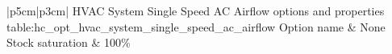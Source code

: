 \begin{customLongTable}{ |p{5cm}|p{3cm}| }
{HVAC System Single Speed AC Airflow options and properties} {table:hc_opt_hvac_system_single_speed_ac_airflow}
{Option name & None}
\endhead
\hline
Stock saturation & 100\% \\ \hline
\end{customLongTable}

